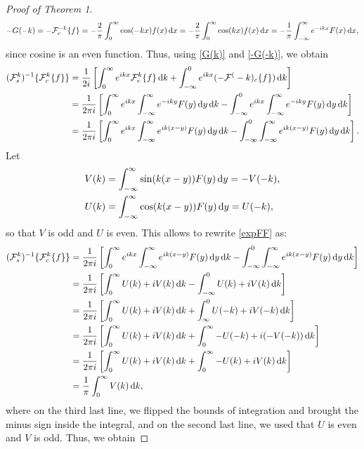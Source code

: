\documentclass[10pt,reqno,oneside,a4paper, landscape]{article}
\begin{document}
\begin{proof}[Proof of Theorem 1]
\begin{equation}
-G(- k) = - \mathcal{F}^{-k}_c \{ f \}  = -\frac{2}{\pi} \int^{\infty}_0 \cos(-kx) f(x) \,\mathrm{d} x =-\frac{2}{\pi} \int^{\infty}_0 \cos(kx) f(x) \,\mathrm{d} x = - \frac{1}{\pi} \int_{-\infty}^\infty e^{-ikx} F(x) \,\mathrm{d} x, 
\end{equation}
since cosine is an even function. Thus, using \eqref{G(k)} and \eqref{-G(-k)}, we obtain
\begin{align}
(\mathcal{F}^k_s)^{-1} \{ \mathcal{F}^k_c \{ f \} \} &= \frac{1}{2i} \left[ \int^{\infty}_0 e^{ikx} \mathcal{F}^k_c \{ f \} \,\mathrm{d} k + \int_{-\infty}^0 e^{ikx} (-\mathcal{F}^(-k)_c \{ f \}) \,\mathrm{d} k\right] \nonumber \\
&= \frac{1}{2\pi i} \left[ \int^{\infty}_0 e^{ikx}  \int_{-\infty}^\infty e^{-iky} F(y) \,\mathrm{d} y \,\mathrm{d} k - \int_{-\infty}^0 e^{ikx} \int_{-\infty}^\infty e^{-iky} F(y) \,\mathrm{d} y \,\mathrm{d} k\right] \nonumber \\
&= \frac{1}{2\pi i} \left[ \int^{\infty}_0 e^{ikx} \int_{-\infty}^\infty e^{ik(x-y)} F(y) \,\mathrm{d} y \,\mathrm{d} k - \int_{-\infty}^0 \int_{-\infty}^\infty e^{ik(x-y)} F(y) \,\mathrm{d} y \,\mathrm{d} k\right]. \label{expFF}
\end{align}
Let
\begin{align*}
V(k) &= \int_{-\infty}^\infty \sin(k(x-y)) F(y) \,\mathrm{d} y = -V(-k), \\
U(k) &= \int_{-\infty}^\infty \cos(k(x-y)) F(y) \,\mathrm{d} y = U(-k),
\end{align*}
so that $V$ is odd and $U$ is even. This allows to rewrite \eqref{expFF} as:
\begin{align*}
(\mathcal{F}^k_s)^{-1} \{ \mathcal{F}^k_c \{ f \} \} &= \frac{1}{2\pi i} \left[ \int^{\infty}_0 e^{ikx} \int_{-\infty}^\infty e^{ik(x-y)} F(y) \,\mathrm{d} y \,\mathrm{d} k - \int_{-\infty}^0 \int_{-\infty}^\infty e^{ik(x-y)} F(y) \,\mathrm{d} y \,\mathrm{d} k\right] \\
&= \frac{1}{2\pi i} \left[ \int^{\infty}_0 U(k) +i V(k) \,\mathrm{d} k - \int_{-\infty}^0 U(k) + i V(k) \,\mathrm{d} k\right] \\
&= \frac{1}{2\pi i} \left[ \int^{\infty}_0 U(k) +i V(k) \,\mathrm{d} k + \int_{\infty}^0 U(-k) + i V(-k) \,\mathrm{d} k\right] \\
&= \frac{1}{2\pi i} \left[ \int^{\infty}_0 U(k) +i V(k) \,\mathrm{d} k + \int^{\infty}_0 -U(-k) + i (-V(-k)) \,\mathrm{d} k\right] \\
&= \frac{1}{2\pi i} \left[ \int^{\infty}_0 U(k) +i V(k) \,\mathrm{d} k + \int^{\infty}_0 -U(k) + i V(k) \,\mathrm{d} k\right] \\
&= \frac{1}{\pi } \int^{\infty}_0 V(k) \,\mathrm{d} k,
\end{align*}
where on the third last line, we flipped the bounds of integration and brought the minus sign inside the integral, and on the second last line, we used that $U$ is even and $V$ is odd. Thus, we obtain 

\end{proof}
\end{document}
